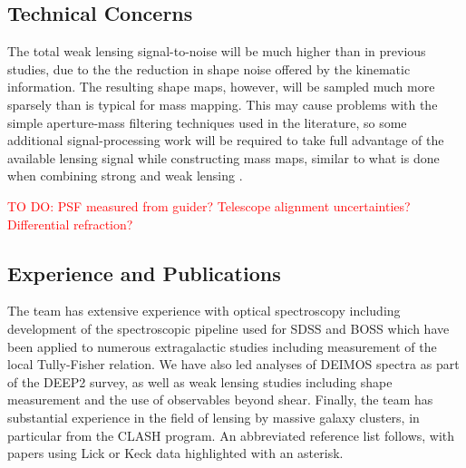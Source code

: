 \documentclass[12pt]{article}
\begin{document}
\subsection{Technical Concerns}
The total weak lensing signal-to-noise will be much higher than in previous studies, due to the the reduction in shape noise offered by the kinematic information. The resulting shape maps, however, will be sampled much more sparsely than is typical for mass mapping. This may cause problems with the simple aperture-mass filtering techniques used in the literature, so some additional signal-processing work will be required to take full advantage of the available lensing signal while constructing mass maps, similar to what is done when combining strong and weak lensing \citep[e.g.][]{Merten2009}.

\textcolor{Red}{TO DO: PSF measured from guider? Telescope alignment uncertainties? Differential refraction?}

\subsection{Experience and Publications}
The team has extensive experience with optical spectroscopy including development of the spectroscopic pipeline used for SDSS and BOSS which have been applied to numerous extragalactic studies including measurement of the local Tully-Fisher relation. We have also led analyses of DEIMOS spectra as part of the DEEP2 survey, as well as weak lensing studies including shape measurement and the use of observables beyond shear. {\color{red} Finally, the team has substantial experience in the field of lensing by massive galaxy clusters, in particular from the CLASH program.} An abbreviated reference list follows, with papers using Lick or Keck data highlighted with an asterisk.
\end{document}
